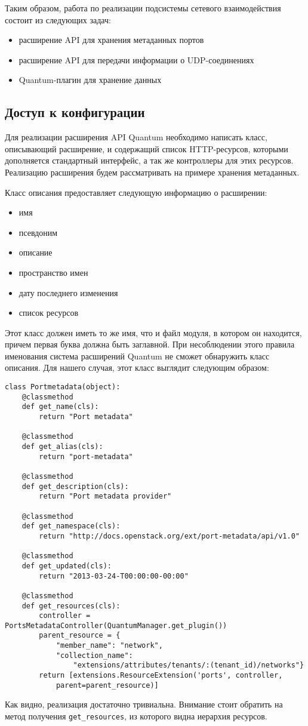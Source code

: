Таким образом, работа по реализации подсистемы сетевого взаимодействия состоит из следующих 
задач:
\begin{itemize}
    \item расширение API для хранения метаданных портов
    \item расширение API для передачи информации о UDP-соединениях
    \item Quantum-плагин для хранение данных
\end{itemize}
 
\subsection{Доступ к конфигурации} 
 
Для реализации расширения API Quantum необходимо написать класс, описывающий
расширение, и содержащий список HTTP-ресурсов, которыми дополняется стандартный интерфейс,
а так же контроллеры для этих ресурсов. Реализацию расширения будем рассматривать
на примере хранения метаданных.

Класс описания предоставляет следующую информацию о расширении:
\begin{itemize}
    \item имя
    \item псевдоним
    \item описание
    \item пространство имен
    \item дату последнего изменения
    \item список ресурсов
\end{itemize}
Этот класс должен иметь то же имя, что и файл модуля, в котором он находится, причем
первая буква должна быть заглавной. При несоблюдении этого правила именования система
расширений Quantum не сможет обнаружить класс описания.
Для нашего случая, этот класс выглядит следующим образом:
\begin{lstlisting}
class Portmetadata(object):
    @classmethod
    def get_name(cls):
        return "Port metadata"

    @classmethod
    def get_alias(cls):
        return "port-metadata"

    @classmethod
    def get_description(cls):
        return "Port metadata provider"

    @classmethod
    def get_namespace(cls):
        return "http://docs.openstack.org/ext/port-metadata/api/v1.0"

    @classmethod
    def get_updated(cls):
        return "2013-03-24-T00:00:00-00:00"

    @classmethod
    def get_resources(cls):
        controller = PortsMetadataController(QuantumManager.get_plugin())
        parent_resource = {
            "member_name": "network",
            "collection_name": 
                "extensions/attributes/tenants/:(tenant_id)/networks"}        
        return [extensions.ResourceExtension('ports', controller,
            parent=parent_resource)]
\end{lstlisting}
Как видно, реализация достаточно тривиальна. Внимание стоит обратить на метод
получения \verb`get_resources`, из которого видна иерархия ресурсов.

